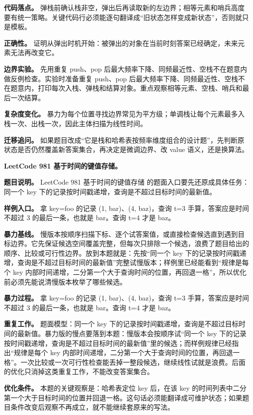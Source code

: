 \textbf{代码落点。} 弹栈前确认栈非空，弹出后再读取新的左边界；相等元素和哨兵高度要有统一策略。关键代码行必须能逐句翻译成“旧状态怎样变成新状态”，否则就只是模板。

\textbf{正确性。} 证明从弹出时机开始：被弹出的对象在当前时刻答案已经确定，未来元素无法再改变它。

\textbf{边界实验。} 先用重复 push、pop 后最大频率下降、同频最近性、空栈不在题意内做反例检查。实验时准备重复 push、pop 后最大频率下降、同频最近性、空栈不在题意内，打印每次入栈、弹栈和结算对象。重点观察相等元素、空栈、哨兵和最后一次结算。

\textbf{复杂度变化。} 暴力为每个位置寻找边界常见为平方级；单调栈让每个元素最多入栈一次、出栈一次，因此主体扫描为线性时间。

\textbf{迁移追问。} 如果题目改成“它是栈和哈希表按频率维度组合的设计题”，先判断原状态是否仍然覆盖新答案集合，再决定是微调边界、改 value 语义，还是换算法。

\noindent\textbf{LeetCode 981 基于时间的键值存储。}

\textbf{题目说明。} LeetCode 981 基于时间的键值存储 的题面入口要先还原成具体任务：同一个 key 下的记录按时间戳递增，查询是不超过目标时间的最新值。

\textbf{样例入口。} 拿 key=foo 的记录 (1, bar)、(4, baz)，查询 t=3 手算，答案应是时间不超过 3 的最后一条，也就是 bar。查询 t=4 才是 baz。

\textbf{暴力基线。} 慢版本按顺序扫描下标、逐个试答案值，或直接检查候选直到遇到目标边界。它先保证候选空间覆盖完整，但每次只排除一个候选，浪费了题目给出的顺序、比较或可行性边界。放到本题就是：先按“同一个 key 下的记录按时间戳递增，查询是不超过目标时间的最新值”完整试慢版本；样例里已经能看到“规律是每个 key 内部时间递增，二分第一个大于查询时间的位置，再回退一格”，所以优化前必须先能说清慢版本枚举了哪些候选。

\textbf{暴力过程。} 拿 key=foo 的记录 (1, bar)、(4, baz)，查询 t=3 手算，答案应是时间不超过 3 的最后一条，也就是 bar。查询 t=4 才是 baz。

\textbf{重复工作。} 题面模型：同一个 key 下的记录按时间戳递增，查询是不超过目标时间的最新值。暴力版的慢点要落到本题：慢版本会按顺序试“同一个 key 下的记录按时间戳递增，查询是不超过目标时间的最新值”里的候选；而样例规律已经指出“规律是每个 key 内部时间递增，二分第一个大于查询时间的位置，再回退一格”。一次比较或一次可行性检查能丢掉一整段候选，继续线性试就是浪费。后面的优化只消掉这类重复工作，不能改变答案集合。

\textbf{优化条件。} 本题的关键观察是：哈希表定位 key 后，在该 key 的时间列表中二分第一个大于目标时间的位置并回退一格。这句话必须能翻译成可维护状态；如果题目条件改变后观察不再成立，就不能继续套原来的写法。

